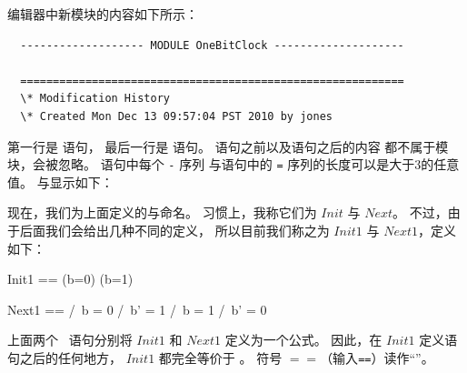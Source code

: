 \begin{ch}
  编辑器中新模块的内容如下所示：
  \begin{display}
  \begin{verbatim}
  ------------------- MODULE OneBitClock --------------------

  ===========================================================
  \* Modification History
  \* Created Mon Dec 13 09:57:04 PST 2010 by jones
  \end{verbatim}
  \end{display}
  第一行是%
  \emph{\tlamoduleopening}语句，
  最后一行是%
  \emph{\tlamoduleclosing}语句。
  \tlamoduleopening{}语句之前以及\tlamoduleclosing{}语句之后的内容
  都不属于模块，会被忽略。
  \tlamoduleopening{}语句中每个 \verb|-| 序列
  与\tlamoduleclosing{}语句中的 \verb|=| 序列的长度可以是大于3的任意值。
  \tlamoduleopening{}与\tlamoduleclosing{}显示如下：
  \begin{display}
  \end{display}
  现在，我们为上面定义的\tlainitpredicate{}与\tlanextstateaction{}命名。
  习惯上，我称它们为 $Init$ 与 $Next$。
  不过，由于后面我们会给出几种不同的定义，
  所以目前我们称之为 $Init1$ 与 $Next1$，定义如下：
  \begin{display}
    \begin{notla}
    Init1 == (b=0) \/ (b=1)
	 
    Next1 == \/ /\ b = 0
		/\ b' = 1
	     \/ /\ b = 1
		/\ b' = 0
    \end{notla}
    \begin{tlatex}
    \par\vspace{8.0pt}%
    \end{tlatex}
  \end{display}
  上面两个 \tlaplus\ 语句分别将 $Init1$ 和 $Next1$ 定义为一个公式。
  因此，在 $Init1$ 定义语句之后的任何地方，
  $Init1$ 都完全等价于 。
  符号 $\!==\!$（输入\verb|==|）读作``\emph{\tladefeq}''。
\end{ch}

